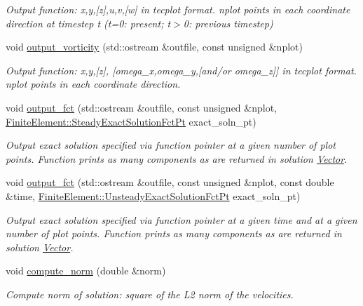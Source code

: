 \begin{DoxyCompactItemize}
\begin{DoxyCompactList}\small\item\em Output function\+: x,y,\mbox{[}z\mbox{]},u,v,\mbox{[}w\mbox{]} in tecplot format. nplot points in each coordinate direction at timestep t (t=0\+: present; t$>$0\+: previous timestep) \end{DoxyCompactList}\item 
void \hyperlink{classoomph_1_1NavierStokesEquations_ae3bb4e367f7476e7bd3a3648bd8ce38b}{output\+\_\+vorticity} (std\+::ostream \&outfile, const unsigned \&nplot)
\begin{DoxyCompactList}\small\item\em Output function\+: x,y,\mbox{[}z\mbox{]}, \mbox{[}omega\+\_\+x,omega\+\_\+y,\mbox{[}and/or omega\+\_\+z\mbox{]}\mbox{]} in tecplot format. nplot points in each coordinate direction. \end{DoxyCompactList}\item 
void \hyperlink{classoomph_1_1NavierStokesEquations_afcfdf3272b9ab0c0baf1508e47164c06}{output\+\_\+fct} (std\+::ostream \&outfile, const unsigned \&nplot, \hyperlink{classoomph_1_1FiniteElement_a690fd33af26cc3e84f39bba6d5a85202}{Finite\+Element\+::\+Steady\+Exact\+Solution\+Fct\+Pt} exact\+\_\+soln\+\_\+pt)
\begin{DoxyCompactList}\small\item\em Output exact solution specified via function pointer at a given number of plot points. Function prints as many components as are returned in solution \hyperlink{classoomph_1_1Vector}{Vector}. \end{DoxyCompactList}\item 
void \hyperlink{classoomph_1_1NavierStokesEquations_ae2c60e77c8348895c883176845bcc5bd}{output\+\_\+fct} (std\+::ostream \&outfile, const unsigned \&nplot, const double \&time, \hyperlink{classoomph_1_1FiniteElement_ad4ecf2b61b158a4b4d351a60d23c633e}{Finite\+Element\+::\+Unsteady\+Exact\+Solution\+Fct\+Pt} exact\+\_\+soln\+\_\+pt)
\begin{DoxyCompactList}\small\item\em Output exact solution specified via function pointer at a given time and at a given number of plot points. Function prints as many components as are returned in solution \hyperlink{classoomph_1_1Vector}{Vector}. \end{DoxyCompactList}\item 
void \hyperlink{classoomph_1_1NavierStokesEquations_a929b419d4927aafeee72de9d5da9e595}{compute\+\_\+norm} (double \&norm)
\begin{DoxyCompactList}\small\item\em Compute norm of solution\+: square of the L2 norm of the velocities. \end{DoxyCompactList}\item 

\end{DoxyCompactItemize}
